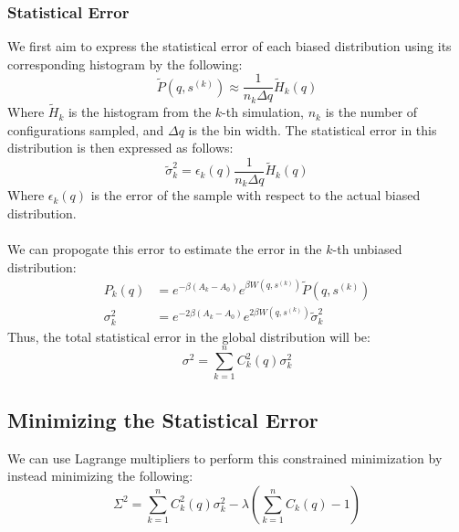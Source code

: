 \documentclass{article}
\begin{document}
\subsubsection{Statistical Error}
We first aim to express the statistical error of each biased distribution using its corresponding histogram by the following:
$$ \tilde{P}(q, s^{(k)}) \approx \frac{1}{n_k \Delta q} \tilde{H}_k(q) $$
Where $\tilde{H}_k$ is the histogram from the $k$-th simulation, $n_k$ is the number of configurations sampled, and $\Delta q$ is the bin width.
The statistical error in this distribution is then expressed as follows:
$$ \tilde{\sigma}_k^2 = \epsilon_k(q) \frac{1}{n_k \Delta q} \tilde{H}_k(q)$$
Where $\epsilon_k(q)$ is the error of the sample with respect to the actual biased distribution.
\\\\
We can propogate this error to estimate the error in the $k$-th unbiased distribution:
\begin{align*}
    P_k(q) &= e^{-\beta(A_k - A_0)} e^{\beta W\left(q, s^{(k)}\right)} \tilde{P}(q, s^{(k)})\\
    \sigma_k^2 &= e^{-2 \beta (A_k - A_0)}e^{2 \beta W(q, s^{(k)})}\tilde{\sigma}_k^2
\end{align*}
Thus, the total statistical error in the global distribution will be:
$$ \sigma^2 = \sum_{k=1}^n C_k^2(q) \sigma_k^2 $$

\subsection{Minimizing the Statistical Error}
We can use Lagrange multipliers to perform this constrained minimization by instead minimizing the following:
$$ \Sigma^2 = \sum_{k=1}^n C_k^2(q) \sigma_k^2 - \lambda \left(\sum_{k=1}^n C_k(q) - 1\right)$$
\end{document}
